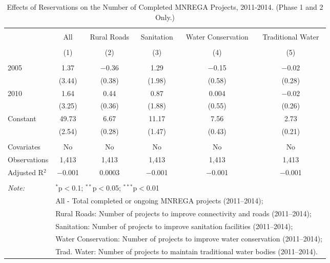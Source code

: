 
\begin{table}[!htbp] \centering 
  \caption{Effects of Reservations on the Number of Completed MNREGA Projects, 2011-2014. (Phase 1 and 2 Only.)} 
  \label{main_mnrega_phase_1_2} 
\scriptsize 
\begin{tabular}{@{\extracolsep{5pt}}lccccc} 
\\[-1.8ex]\hline 
\hline \\[-1.8ex] 
 & All & Rural Roads & Sanitation & Water Conservation & Traditional Water \\ 
\\[-1.8ex] & (1) & (2) & (3) & (4) & (5)\\ 
\hline \\[-1.8ex] 
 2005 & 1.37 & $-$0.36 & 1.29 & $-$0.15 & $-$0.02 \\ 
  & (3.44) & (0.38) & (1.98) & (0.58) & (0.28) \\ 
  2010 & 1.64 & 0.44 & 0.87 & 0.004 & $-$0.02 \\ 
  & (3.25) & (0.36) & (1.88) & (0.55) & (0.26) \\ 
  Constant & 49.73 & 6.67 & 11.17 & 7.56 & 2.73 \\ 
  & (2.54) & (0.28) & (1.47) & (0.43) & (0.21) \\ 
 \hline \\[-1.8ex] 
Covariates & No & No & No & No & No \\ 
Observations & 1,413 & 1,413 & 1,413 & 1,413 & 1,413 \\ 
Adjusted R$^{2}$ & $-$0.001 & 0.0003 & $-$0.001 & $-$0.001 & $-$0.001 \\ 
\hline 
\hline \\[-1.8ex] 
\textit{Note:}  & \multicolumn{5}{l}{$^{*}$p$<$0.1; $^{**}$p$<$0.05; $^{***}$p$<$0.01} \\ 
 & \multicolumn{5}{l}{All - Total completed or ongoing MNREGA projects (2011--2014);} \\ 
 & \multicolumn{5}{l}{Rural Roads: Number of projects to improve connectivity and roads (2011--2014);} \\ 
 & \multicolumn{5}{l}{Sanitation:  Number of projects to improve sanitation facilities  (2011--2014);} \\ 
 & \multicolumn{5}{l}{Water Conservation: Number of projects to improve water conservation (2011--2014);} \\ 
 & \multicolumn{5}{l}{Trad. Water: Number of projects to maintain traditional water bodies (2011--2014).} \\ 
\end{tabular} 
\end{table} 
